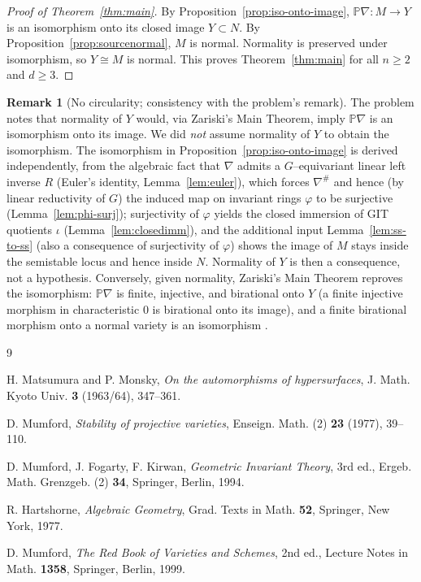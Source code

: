 \documentclass{amsart}
\theoremstyle{definition}
\newtheorem{remark}{Remark}
\newcommand{\PP}{\mathbb{P}}
\newcommand{\nab}{\nabla}
\begin{document}
\begin{proof}[Proof of Theorem~\ref{thm:main}]
By Proposition~\ref{prop:iso-onto-image}, $\PP\nab\colon M\to Y$ is an isomorphism onto its
closed image $Y\subset N$. By Proposition~\ref{prop:sourcenormal}, $M$ is normal. Normality
is preserved under isomorphism, so $Y\cong M$ is normal. This proves Theorem~\ref{thm:main}
for all $n\ge 2$ and $d\ge 3$.
\end{proof}

\begin{remark}[No circularity; consistency with the problem's remark]
The problem notes that normality of $Y$ would, via Zariski's Main Theorem, imply $\PP\nab$ is
an isomorphism onto its image. We did \emph{not} assume normality of $Y$ to obtain the
isomorphism. The isomorphism in Proposition~\ref{prop:iso-onto-image} is derived
independently, from the algebraic fact that $\nab$ admits a $G$--equivariant linear left
inverse $R$ (Euler's identity, Lemma~\ref{lem:euler}), which forces $\nab^{\#}$ and hence (by
linear reductivity of $G$) the induced map on invariant rings $\varphi$ to be surjective
(Lemma~\ref{lem:phi-surj}); surjectivity of $\varphi$ yields the closed immersion of GIT
quotients $\iota$ (Lemma~\ref{lem:closedimm}), and the additional input
Lemma~\ref{lem:ss-to-ss} (also a consequence of surjectivity of $\varphi$) shows the image of
$M$ stays inside the semistable locus and hence inside $N$. Normality of $Y$ is then a
consequence, not a hypothesis. Conversely, given normality, Zariski's Main Theorem reproves
the isomorphism: $\PP\nab$ is finite, injective, and birational onto $Y$ (a finite injective
morphism in characteristic $0$ is birational onto its image), and a finite birational morphism
onto a normal variety is an isomorphism \cite[Ch.~III, \S 9]{Mumford-RB}.
\end{remark}

\begin{thebibliography}{9}

 H. Matsumura and P. Monsky,
\emph{On the automorphisms of hypersurfaces}, J. Math. Kyoto Univ. \textbf{3} (1963/64),
347--361.

 D. Mumford,
\emph{Stability of projective varieties}, Enseign. Math. (2) \textbf{23} (1977), 39--110.

 D. Mumford, J. Fogarty, F. Kirwan,
\emph{Geometric Invariant Theory}, 3rd ed., Ergeb. Math. Grenzgeb. (2) \textbf{34},
Springer, Berlin, 1994.

 R. Hartshorne,
\emph{Algebraic Geometry}, Grad. Texts in Math. \textbf{52}, Springer, New York, 1977.

 D. Mumford,
\emph{The Red Book of Varieties and Schemes}, 2nd ed., Lecture Notes in Math. \textbf{1358},
Springer, Berlin, 1999.

\end{thebibliography}
\end{document}
